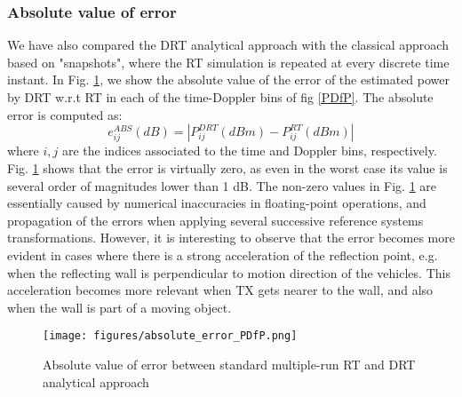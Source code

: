 \subsubsection{Absolute value of error}
We have also compared the DRT analytical approach with the classical approach based on "snapshots", where the RT simulation is repeated at every discrete time instant. In Fig. \ref{absolute_error}, we show the absolute value of the error of the estimated power by DRT w.r.t RT in each of the time-Doppler bins of fig \ref{PDfP}. The absolute error is computed as:
\begin{equation*}
e_{ij}^{ABS}(dB)=|P_{ij}^{DRT}(dBm)-P_{ij}^{RT}(dBm)|
\end{equation*}
where $i,j$ are the indices associated to the time and Doppler bins, respectively.
Fig. \ref{absolute_error} shows that the error is virtually zero, as even in the worst case its value is several order of magnitudes lower than 1 dB. The non-zero values in Fig. \ref{absolute_error} are essentially caused by numerical inaccuracies in floating-point operations, and propagation of the errors when applying several successive reference systems transformations.
However, it is interesting to observe that the error becomes more evident in cases where there is a strong acceleration of the reflection point, e.g. when the reflecting wall is perpendicular to motion direction of the vehicles. This acceleration becomes more relevant when TX gets nearer to the wall, and also when the wall is part of a moving object. 

\begin{figure}[h!]
	\centering
	\texttt{[image: figures/absolute\_error\_PDfP.png]}
	\caption{Absolute value of error between standard multiple-run RT and DRT analytical approach}
	\label{absolute_error}
\end{figure}

